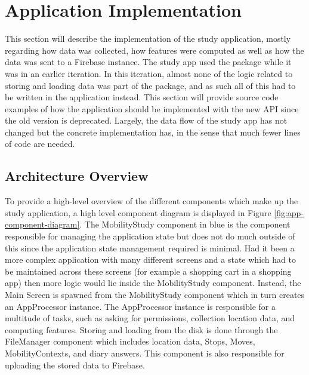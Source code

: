 \section{Application Implementation}
This section will describe the implementation of the study application, mostly regarding how data was collected, how features were computed as well as how the data was sent to a Firebase instance. The study app used the package while it was in an earlier iteration. In this iteration, almost none of the logic related to storing and loading data was part of the package, and as such all of this had to be written in the application instead. This section will provide source code examples of how the application should be implemented with the new API since the old version is deprecated. Largely, the data flow of the study app has not changed but the concrete implementation has, in the sense that much fewer lines of code are needed.

\subsection{Architecture Overview}
To provide a high-level overview of the different components which make up the study application, a high level component diagram is displayed in Figure \ref{fig:app-component-diagram}. The MobilityStudy component in blue is the component responsible for managing the application state but does not do much outside of this since the application state management required is minimal. Had it been a more complex application with many different screens and a state which had to be maintained across these screens (for example a shopping cart in a shopping app) then more logic would lie inside the MobilityStudy component. Instead, the Main Screen is spawned from the MobilityStudy component which in turn creates an AppProcessor instance. The AppProcessor instance is responsible for a multitude of tasks, such as asking for permissions, collection location data, and computing features. Storing and loading from the disk is done through the FileManager component which includes location data, Stops, Moves, MobilityContexts, and diary answers. This component is also responsible for uploading the stored data to Firebase.

